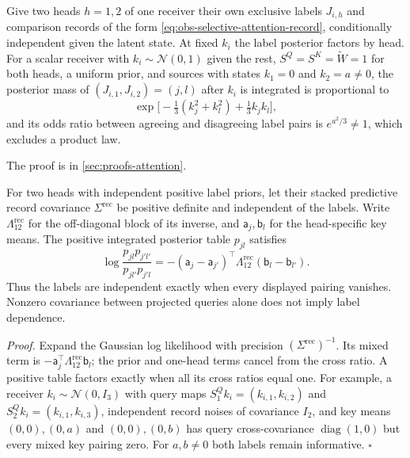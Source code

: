 Give two heads \(h=1,2\) of one receiver their own exclusive labels
\(J_{i,h}\) and comparison records of the form
\eqref{eq:obs-selective-attention-record}, conditionally independent given the
latent state. At fixed \(k_i\) the label posterior factors by head. For a
scalar receiver with \(k_i\sim\mathcal N(0,1)\) given the rest,
\(S^Q=S^K=\widetilde W=1\) for both heads, a uniform prior, and sources with
states \(k_1=0\) and \(k_2=a\ne0\), the posterior mass of
\((J_{i,1},J_{i,2})=(j,l)\) after \(k_i\) is integrated is proportional to
\begin{equation}
\exp\bigl[-\tfrac13(k_j^2+k_l^2)+\tfrac13k_jk_l\bigr],
\label{eq:obs-selective-head-coupling}
\end{equation}
and its odds ratio between agreeing and disagreeing label pairs is
\(e^{a^2/3}\ne1\), which excludes a product law.

The proof is in \cref{sec:proofs-attention}.

For two heads with independent positive label priors, let their stacked
predictive record covariance $\Sigma^{\mathrm{rec}}$ be positive definite
and independent of the labels. Write $\Lambda^{\mathrm{rec}}_{12}$ for the
off-diagonal block of its inverse, and $\mathsf a_j,\mathsf b_l$ for the
head-specific key means. The positive integrated posterior table $p_{jl}$
satisfies
\begin{equation}
\log\frac{p_{jl}p_{j'l'}}{p_{jl'}p_{j'l}}
=-(\mathsf a_j-\mathsf a_{j'})^\top
\Lambda^{\mathrm{rec}}_{12}(\mathsf b_l-\mathsf b_{l'}).
\label{eq:obs-head-cross-ratio}
\end{equation}
Thus the labels are independent exactly when every displayed pairing
vanishes. Nonzero covariance between projected queries alone does not imply
label dependence. 

\noindent\emph{Proof.}
Expand the Gaussian log likelihood with precision
$(\Sigma^{\mathrm{rec}})^{-1}$. Its mixed term is
$-\mathsf a_j^\top\Lambda^{\mathrm{rec}}_{12}\mathsf b_l$; the prior
and one-head terms cancel from the cross ratio. A positive table factors
exactly when all its cross ratios equal one. For example, a receiver
$k_i\sim\mathcal N(0,I_3)$ with query maps
$S^Q_1k_i=(k_{i,1},k_{i,2})$ and
$S^Q_2k_i=(k_{i,1},k_{i,3})$, independent record noises of covariance $I_2$,
and key means $(0,0),(0,a)$ and $(0,0),(0,b)$ has query cross-covariance
$\operatorname{diag}(1,0)$ but every mixed key pairing zero. For
$a,b\ne0$ both labels remain informative. $\square$

